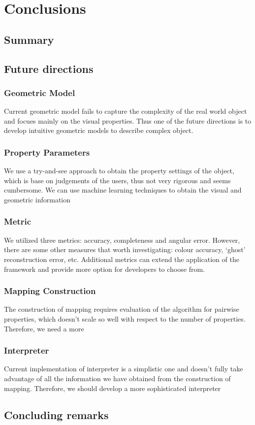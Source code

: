 
\chapter{Conclusions}
\label{sec:conclusion}

\section{Summary}

\section{Future directions}

\subsection{Geometric Model}
Current geometric model fails to capture the complexity of the real world object and focues mainly on the visual properties. Thus one of the future directions is to develop intuitive geometric models to describe complex object.

\subsection{Property Parameters}
We use a try-and-see approach to obtain the property settings of the object, which is base on judgements of the users, thus not very rigorous and seems cumbersome. We can use machine learning techniques to obtain the visual and geometric information

\subsection{Metric}
We utilized three metrics: accuracy, completeness and angular error. However, there are some other measures that worth investigating: colour accuracy, `ghost' reconstruction error, etc. Additional metrics can extend the application of the framework and provide more option for developers to choose from.

\subsection{Mapping Construction}
The construction of mapping requires evaluation of the algorithm for pairwise properties, which doesn't scale so well with respect to the number of properties. Therefore, we need a more 

\subsection{Interpreter}
Current implementation of interpreter is a simplistic one and doesn't fully take advantage of all the information we have obtained from the construction of mapping. Therefore, we should develop a more sophisticated interpreter

\section{Concluding remarks}
